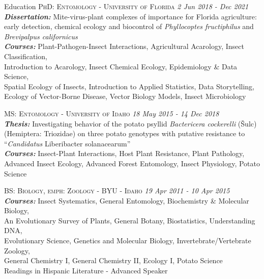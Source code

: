 \documentclass{resume} %
\begin{document}
\begin{rSection}{Education}
	\textsc{PhD: Entomology - University of Florida} \hfill {\em 2 Jun 2018 - Dec 2021}\\
	\textit{\textbf{Dissertation:}} Mite-virus-plant complexes of importance for Florida agriculture: early detection, chemical ecology and biocontrol of \textit{Phyllocoptes fructiphilus} and \textit{Brevipalpus californicus} \\
	\textit{\textbf{Courses:}} Plant-Pathogen-Insect Interactions, Agricultural Acarology, Insect Classification,\\
	Introduction to Acarology, Insect Chemical Ecology, Epidemiology \& Data Science,\\
	Spatial Ecology of Insects, Introduction to Applied Statistics, Data Storytelling,\\
	Ecology of Vector-Borne Disease, Vector Biology Models, Insect Microbiology\\ \hfill

	\textsc{MS: Entomology - University of Idaho} \hfill {\em 18 May 2015 - 14 Dec 2018}\\ \textit{\textbf{Thesis:}} Investigating behavior of the potato psyllid \textit{Bactericera cockerelli} (Šulc)\\
	(Hemiptera: Triozidae) on three potato genotypes with putative resistance to\\ “\textit{Candidatus} Liberibacter solanacearum”\\
	\textit{\textbf{Courses:}} Insect-Plant Interactions, Host Plant Resistance, Plant Pathology, Advanced Insect Ecology, Advanced Forest Entomology, Insect Physiology, Potato Science\\ \hfill
	
	\textsc{BS: Biology, emph: Zoology - BYU - Idaho} \hfill {\em 19 Apr 2011 - 10 Apr 2015}\\ \textit{\textbf{Courses:}} Insect Systematics, General Entomology, Biochemistry \& Molecular Biology,\\
	An Evolutionary Survey of Plants, General Botany, Biostatistics, Understanding DNA,\\
	Evolutionary Science, Genetics and Molecular Biology, Invertebrate/Vertebrate Zoology,\\
	General Chemistry I, General Chemistry II,  Ecology I, Potato Science\\
	Readings in Hispanic Literature - Advanced Speaker\\ \hfill
\end{rSection}
\end{document}
